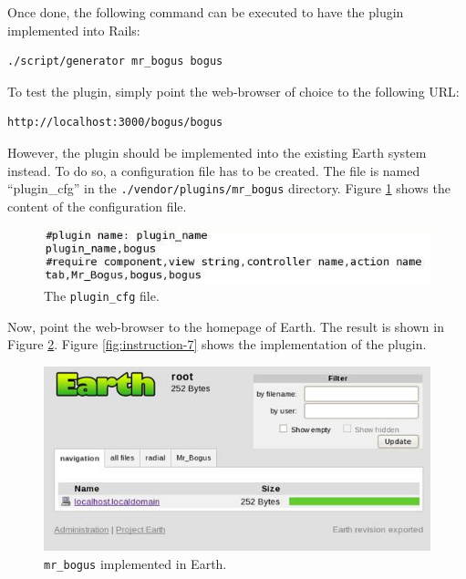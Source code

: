 \documentclass{article}
\begin{document}
Once done, the following command can be executed to have the plugin implemented into Rails: 

\begin{verbatim}
./script/generator mr_bogus bogus
\end{verbatim}

To test the plugin, simply point the web-browser of choice to the following URL:

\begin{verbatim}
http://localhost:3000/bogus/bogus
\end{verbatim}

However, the plugin should be implemented into the existing Earth system instead. To do so, a configuration file has to be created. The file is named ``plugin\_cfg'' in the \texttt{./vendor/plugins/mr\_bogus} directory. Figure \ref{fig:asd} shows the content of the configuration file.

\begin{figure}
    \centering
    \includegraphics[scale=0.5]{fig/asd.jpg}
    \caption{The \texttt{plugin\_cfg} file.}
    \label{fig:asd}
\end{figure}

Now, point the web-browser to the homepage of Earth. The result is shown in Figure \ref{fig:instruction-6}. Figure \ref{fig:instruction-7} shows the implementation of the plugin.

\begin{figure}
    \centering        
    \includegraphics[scale=0.5]{fig/instruction-6.jpg}
    \caption{\texttt{mr\_bogus} implemented in Earth.}
    \label{fig:instruction-6}
\end{figure}
\end{document}
